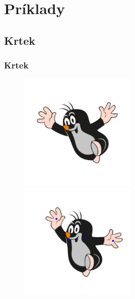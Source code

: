 \documentclass[a4paper]{beamer}
\begin{document}
\section{Príklady}

\subsection{Krtek}
\begin{frame}
	\frametitle{Krtek}
	\begin{figure}
		\centering
		\includegraphics[width=0.5\textwidth,keepaspectratio]{pic/results/krtek1}
		\includegraphics[width=0.5\textwidth,keepaspectratio]{pic/results/krtek2}
	\end{figure}
\end{frame}
\end{document}
